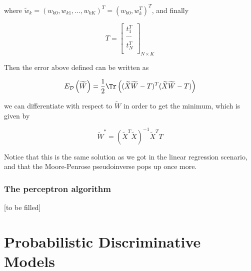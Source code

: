 where $\widetilde{w}_k = (w_{k0}, w_{k1}, \dots, w_{kK})^T = (w_{k0}, w_k^T)^T$, and finally

\[T = \begin{bmatrix}
	t_1^T\\
	\cdots\\
	t_N^T\\
\end{bmatrix}_{N\times K} \]

Then the error above defined can be written as

\[E_\mathcal{D}\left(\widetilde{W}\right) = \frac{1}{2}\Tr\left((\widetilde{X}\widetilde{W} - T)^T(\widetilde{X}\widetilde{W} - T)\right)\]

we can differentiate with respect to $\widetilde{W}$ in order to get the minimum, which is given by

\[\widetilde{W}^* = (\widetilde{X}^T\widetilde{X})^{-1}\widetilde{X}^TT\]

Notice that this is the same solution as we got in the linear regression scenario, and that the Moore-Penrose pseudoinverse pops up once more.

\subsubsection{The perceptron algorithm}

[to be filled]

\section{Probabilistic Discriminative Models}
